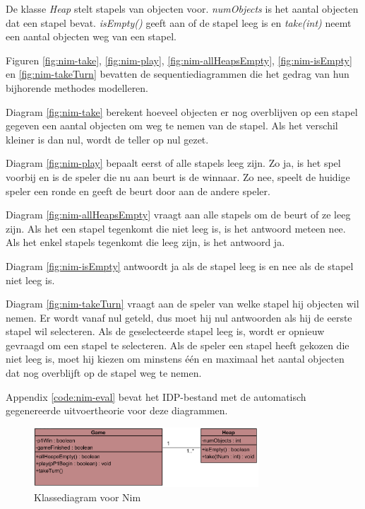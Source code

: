 De klasse \textit{Heap} stelt stapels van objecten voor. \textit{numObjects} is het aantal objecten dat een stapel bevat. \textit{isEmpty()} geeft aan of de stapel leeg is en \textit{take(int)} neemt een aantal objecten weg van een stapel.

Figuren \ref{fig:nim-take}, \ref{fig:nim-play}, \ref{fig:nim-allHeapsEmpty}, \ref{fig:nim-isEmpty} en \ref{fig:nim-takeTurn} bevatten de sequentiediagrammen die het gedrag van hun bijhorende methodes modelleren.

Diagram \ref{fig:nim-take} berekent hoeveel objecten er nog overblijven op een stapel gegeven een aantal objecten om weg te nemen van de stapel. Als het verschil kleiner is dan nul, wordt de teller op nul gezet.

Diagram \ref{fig:nim-play} bepaalt eerst of alle stapels leeg zijn. Zo ja, is het spel voorbij en is de speler die nu aan beurt is de winnaar. Zo nee, speelt de huidige speler een ronde en geeft de beurt door aan de andere speler.

Diagram \ref{fig:nim-allHeapsEmpty} vraagt aan alle stapels om de beurt of ze leeg zijn. Als het een stapel tegenkomt die niet leeg is, is het antwoord meteen nee. Als het enkel stapels tegenkomt die leeg zijn, is het antwoord ja.

Diagram \ref{fig:nim-isEmpty} antwoordt ja als de stapel leeg is en nee als de stapel niet leeg is.

Diagram \ref{fig:nim-takeTurn} vraagt aan de speler van welke stapel hij objecten wil nemen. Er wordt vanaf nul geteld, dus moet hij nul antwoorden als hij de eerste stapel wil selecteren. Als de geselecteerde stapel leeg is, wordt er opnieuw gevraagd om een stapel te selecteren. Als de speler een stapel heeft gekozen die niet leeg is, moet hij kiezen om minstens \'e\'en en maximaal het aantal objecten dat nog overblijft op de stapel weg te nemen.

Appendix \ref{code:nim-eval} bevat het IDP-bestand met de automatisch gegenereerde uitvoertheorie voor deze diagrammen.

\begin{figure}[htp]
	\centering
	\includegraphics[width=0.75\textwidth]{chap-evaluatie/ClassDiagram1.png}
	\caption{Klassediagram voor Nim}
	\label{fig:nim-cd}
\end{figure}

